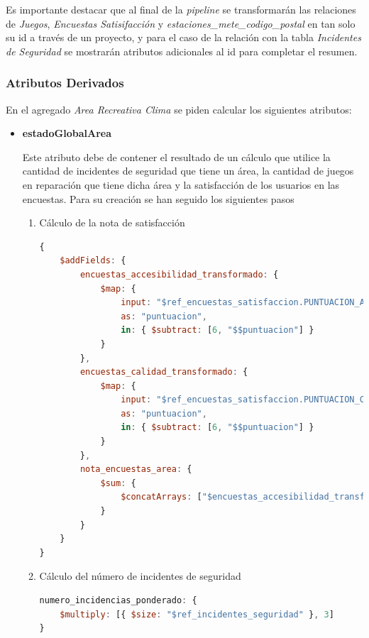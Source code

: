 \documentclass[]{article}
\begin{document}
Es importante destacar que al final de la \textit{pipeline} se transformarán las relaciones de \textit{Juegos}, \textit{Encuestas Satisifacción} y \textit{estaciones\_mete\_codigo\_postal} en tan solo su id a través de un proyecto, y para el caso de la relación con la tabla \textit{Incidentes de Seguridad} se mostrarán atributos adicionales al id para completar el resumen.
\subsubsection{Atributos Derivados}
\label{subsubsec:derivados_area}

En el agregado \textit{Area Recreativa Clima} se piden calcular los siguientes atributos:
\begin{itemize}
    \item \textbf{estadoGlobalArea}
    
    Este atributo debe de contener el resultado de un cálculo que utilice la cantidad de incidentes de seguridad que tiene un área, la cantidad de juegos en reparación que tiene dicha área y la satisfacción de los usuarios en las encuestas. Para su creación se han seguido los siguientes pasos
    \begin{enumerate}
        \item Cálculo de la nota de satisfacción
        
        \begin{lstlisting}[language=JavaScript, caption=Calculo del campo nota\_encuestas\_areas]
{
    $addFields: {
        encuestas_accesibilidad_transformado: {
            $map: {
                input: "$ref_encuestas_satisfaccion.PUNTUACION_ACCESIBILIDAD",
                as: "puntuacion",
                in: { $subtract: [6, "$$puntuacion"] }
            }
        },
        encuestas_calidad_transformado: {
            $map: {
                input: "$ref_encuestas_satisfaccion.PUNTUACION_CALIDAD",
                as: "puntuacion",
                in: { $subtract: [6, "$$puntuacion"] }
            }
        },
        nota_encuestas_area: {
            $sum: {
                $concatArrays: ["$encuestas_accesibilidad_transformado", "$encuestas_calidad_transformado"]
            }
        }
    }
}

        \end{lstlisting}

        \item Cálculo del número de incidentes de seguridad
        
        \begin{lstlisting}[language=JavaScript, caption=Ponderación del número de incidencias]
numero_incidencias_ponderado: {
    $multiply: [{ $size: "$ref_incidentes_seguridad" }, 3]
}
        \end{lstlisting}


\end{enumerate}
\end{itemize}
\end{document}
